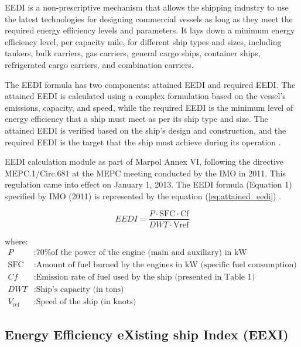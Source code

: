 EEDI is a non-prescriptive mechanism that allows the shipping industry to use the latest technologies for designing commercial vessels as long as they meet the required energy efficiency levels and parameters.
It lays down a minimum energy efficiency level, per capacity mile, for different ship types and sizes, including tankers, bulk carriers, gas carriers, general cargo ships, container ships, refrigerated cargo carriers, and combination carriers.

The EEDI formula has two components: attained EEDI and required EEDI.
The attained EEDI is calculated using a complex formulation based on the vessel's emissions, capacity, and speed,
while the required EEDI is the minimum level of energy efficiency that a ship must meet as per its ship type and size.
The attained EEDI is verified based on the ship's design and construction, and the required EEDI is the target that the ship must achieve during its operation \autocite{ren2019influence}.

\newpage


EEDI calculation module as part of Marpol Annex VI, following the directive MEPC.1/Circ.681 at the MEPC meeting conducted by the IMO in 2011.
This regulation came into effect on January 1, 2013. The EEDI formula (Equation 1) specified by IMO (2011) is represented by the equation (\ref{eq:attained_eedi}) \autocite{tokucslu2020analyzing}.



\begin{equation}
    EEDI = \frac{{P \cdot \text{SFC} \cdot \text{Cf}}}{{DWT \cdot \text{Vref}}}
    \label{eq:attained_eedi}
\end{equation}


where:
\begin{align*}
    P              & : \text{70\% of the power of the engine (main and auxiliary) in kW}             \\
    \text{SFC}     & : \text{Amount of fuel burned by the engines in kW (specific fuel consumption)} \\
    Cf             & : \text{Emission rate of fuel used by the ship (presented in Table 1)}          \\
    DWT            & : \text{Ship's capacity (in tons)}                                              \\
    V_{\text{ref}} & : \text{Speed of the ship (in knots)}
\end{align*}


\subsection{Energy Efficiency eXisting ship Index  (EEXI)}

